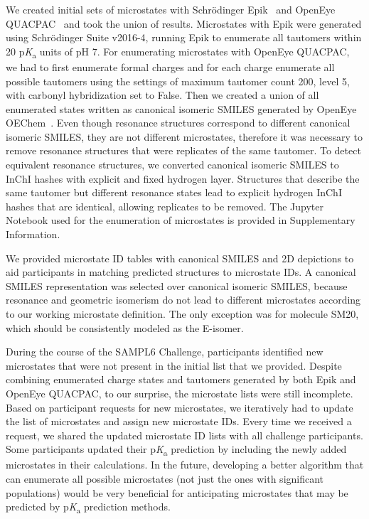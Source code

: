 \documentclass[9pt,lineno,final]{elife}
\newcommand{\pKa}{p\textit{K}\textsubscript{a}}
\begin{document}
We created initial sets of microstates with Schrödinger Epik~\citep{Shelley:2007:J.Comput.AidedMol.Des.} and OpenEye QUACPAC~\citep{quacpac_openeye_2017} and took the union of results. 
Microstates with Epik were generated using Schr\"{o}dinger Suite v2016-4, running Epik to enumerate all tautomers within 20 \pKa{} units of pH 7.
For enumerating microstates with OpenEye QUACPAC, we had to first enumerate formal charges and for each charge enumerate all possible tautomers using the settings of maximum tautomer count 200, level 5, with carbonyl hybridization set to False.
Then we created a union of all enumerated states written as canonical isomeric SMILES generated by OpenEye OEChem~\citep{oechem_openeye_2017}.
Even though resonance structures correspond to different canonical isomeric SMILES, they are not different microstates, therefore it was necessary to remove resonance structures that were replicates of the same tautomer. 
To detect equivalent resonance structures, we converted canonical isomeric SMILES to InChI hashes with explicit and fixed hydrogen layer. 
Structures that describe the same tautomer but different resonance states lead to explicit hydrogen InChI hashes that are identical, allowing replicates to be removed. 
The Jupyter Notebook used for the enumeration of microstates is provided in Supplementary Information. 

We provided microstate ID tables with canonical SMILES and 2D depictions to aid participants in matching predicted structures to microstate IDs. 
A canonical SMILES representation was selected over canonical isomeric SMILES, because resonance and geometric isomerism do not lead to different microstates according to our working microstate definition. 
The only exception was for molecule SM20, which should be consistently modeled as the E-isomer.

During the course of the SAMPL6 Challenge, participants identified new microstates that were not present in the initial list that we provided. 
Despite combining enumerated charge states and tautomers generated by both Epik and OpenEye QUACPAC, to our surprise, the microstate lists were still incomplete.
Based on participant requests for new microstates, we iteratively had to update the list of microstates and assign new microstate IDs.
Every time we received a request, we shared the updated microstate ID lists with all challenge participants.
Some participants updated their \pKa{} prediction by including the newly added microstates in their calculations. 
In the future, developing a better algorithm that can enumerate all possible microstates (not just the ones with significant populations) would be very beneficial for anticipating microstates that may be predicted by \pKa{} prediction methods. 
\end{document}
